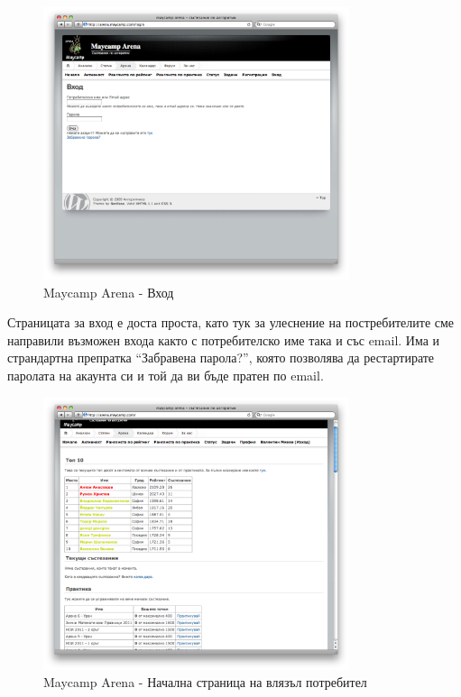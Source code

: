 \documentclass[a4paper,12pt]{article}
\begin{document}
  \begin{figure}[ht]
    \begin{center}
      \includegraphics[width=0.8\textwidth]{images/maycamp_arena_login.png}
    \end{center}
    \caption{Maycamp Arena - Вход}
    \label{arena_login}
  \end{figure}
  
  Страницата за вход е доста проста, като тук за улеснение на постребителите сме направили възможен входа както с потребителско име така и със email. Има и страндартна препратка ``Забравена парола?'', която позволява да рестартирате паролата на акаунта си и той да ви бъде пратен по email.
  
  \begin{figure}[ht]
    \begin{center}
      \includegraphics[width=0.8\textwidth]{images/maycamp_arena_home_logged.png}
    \end{center}
    \caption{Maycamp Arena - Начална страница на влязъл потребител}
    \label{arena_homepage_logged}
  \end{figure}
  
\end{document}
